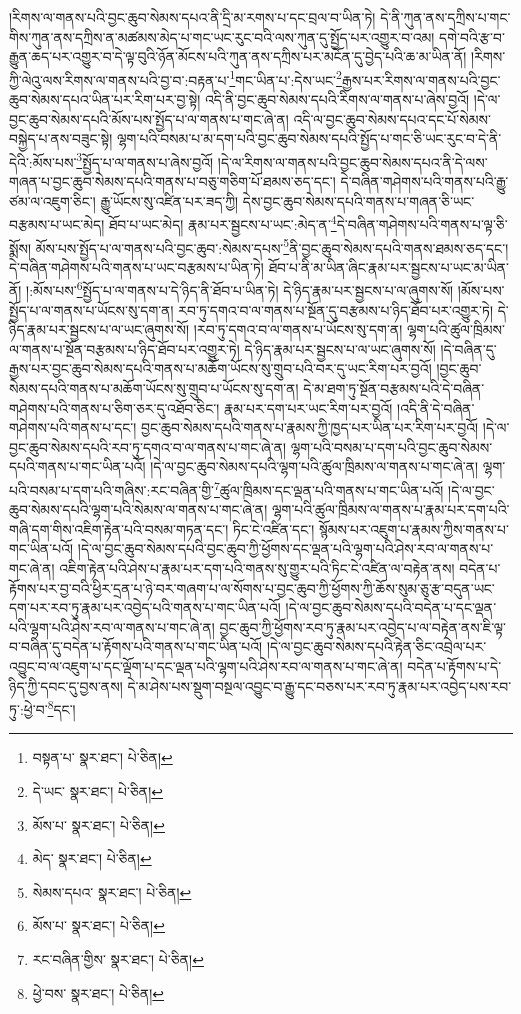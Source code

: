 །རིགས་ལ་གནས་པའི་བྱང་ཆུབ་སེམས་དཔའ་ནི་དྲི་མ་རགས་པ་དང་བྲལ་བ་ཡིན་ཏེ། དེ་ནི་ཀུན་ནས་དཀྲིས་པ་གང་གིས་ཀུན་ནས་དཀྲིས་ན་མཚམས་མེད་པ་གང་ཡང་རུང་བའི་ལས་ཀུན་དུ་སྤྱོད་པར་འགྱུར་བ་འམ། དགེ་བའི་རྩ་བ་རྒྱུན་ཆད་པར་འགྱུར་བ་དེ་ལྟ་བུའི་ཉོན་མོངས་པའི་ཀུན་ནས་དཀྲིས་པར་མངོན་དུ་བྱེད་པའི་ཆ་མ་ཡིན་ནོ། །རིགས་ཀྱི་ལེའུ་ལས་རིགས་ལ་གནས་པའི་བྱ་བ་:བརྟན་པ་\footnote{བསྟན་པ་  སྣར་ཐང་།  པེ་ཅིན། }གང་ཡིན་པ་:དེས་ཡང་\footnote{དེ་ཡང་  སྣར་ཐང་།  པེ་ཅིན། }རྒྱས་པར་རིགས་ལ་གནས་པའི་བྱང་ཆུབ་སེམས་དཔའ་ཡིན་པར་རིག་པར་བྱ་སྟེ། འདི་ནི་བྱང་ཆུབ་སེམས་དཔའི་རིགས་ལ་གནས་པ་ཞེས་བྱའོ། །དེ་ལ་བྱང་ཆུབ་སེམས་དཔའི་མོས་པས་སྤྱོད་པ་ལ་གནས་པ་གང་ཞེ་ན། འདི་ལ་བྱང་ཆུབ་སེམས་དཔའ་དང་པོ་སེམས་བསྐྱེད་པ་ནས་བཟུང་སྟེ། ལྷག་པའི་བསམ་པ་མ་དག་པའི་བྱང་ཆུབ་སེམས་དཔའི་སྤྱོད་པ་གང་ཅི་ཡང་རུང་བ་དེ་ནི་དེའི་:མོས་པས་\footnote{མོས་པ་  སྣར་ཐང་།  པེ་ཅིན། }སྤྱོད་པ་ལ་གནས་པ་ཞེས་བྱའོ། །དེ་ལ་རིགས་ལ་གནས་པའི་བྱང་ཆུབ་སེམས་དཔའ་ནི་དེ་ལས་གཞན་པ་བྱང་ཆུབ་སེམས་དཔའི་གནས་པ་བཅུ་གཅིག་པོ་ཐམས་ཅད་དང་། དེ་བཞིན་གཤེགས་པའི་གནས་པའི་རྒྱུ་ཙམ་ལ་འཇུག་ཅིང་། རྒྱུ་ཡོངས་སུ་འཛིན་པར་ཟད་ཀྱི། དེས་བྱང་ཆུབ་སེམས་དཔའི་གནས་པ་གཞན་ཅི་ཡང་བརྩམས་པ་ཡང་མེད། ཐོབ་པ་ཡང་མེད། རྣམ་པར་སྦྱངས་པ་ཡང་:མེད་ན་\footnote{མེད་  སྣར་ཐང་།  པེ་ཅིན། }དེ་བཞིན་གཤེགས་པའི་གནས་པ་ལྟ་ཅི་སྨོས། མོས་པས་སྤྱོད་པ་ལ་གནས་པའི་བྱང་ཆུབ་:སེམས་དཔས་\footnote{སེམས་དཔའ་  སྣར་ཐང་།  པེ་ཅིན། }ནི་བྱང་ཆུབ་སེམས་དཔའི་གནས་ཐམས་ཅད་དང་། དེ་བཞིན་གཤེགས་པའི་གནས་པ་ཡང་བརྩམས་པ་ཡིན་ཏེ། ཐོབ་པ་ནི་མ་ཡིན་ཞིང་རྣམ་པར་སྦྱངས་པ་ཡང་མ་ཡིན་ནོ། །:མོས་པས་\footnote{མོས་པ་  སྣར་ཐང་།  པེ་ཅིན། }སྤྱོད་པ་ལ་གནས་པ་དེ་ཉིད་ནི་ཐོབ་པ་ཡིན་ཏེ། དེ་ཉིད་རྣམ་པར་སྦྱངས་པ་ལ་ཞུགས་སོ། །མོས་པས་སྤྱོད་པ་ལ་གནས་པ་ཡོངས་སུ་དག་ན། རབ་ཏུ་དགའ་བ་ལ་གནས་པ་སྔོན་དུ་བརྩམས་པ་ཉིད་ཐོབ་པར་འགྱུར་ཏེ། དེ་ཉིད་རྣམ་པར་སྦྱངས་པ་ལ་ཡང་ཞུགས་སོ། །རབ་ཏུ་དགའ་བ་ལ་གནས་པ་ཡོངས་སུ་དག་ན། ལྷག་པའི་ཚུལ་ཁྲིམས་ལ་གནས་པ་སྔོན་བརྩམས་པ་ཉིད་ཐོབ་པར་འགྱུར་ཏེ། དེ་ཉིད་རྣམ་པར་སྦྱངས་པ་ལ་ཡང་ཞུགས་སོ། །དེ་བཞིན་དུ་རྒྱས་པར་བྱང་ཆུབ་སེམས་དཔའི་གནས་པ་མཆོག་ཡོངས་སུ་གྲུབ་པའི་བར་དུ་ཡང་རིག་པར་བྱའོ། །བྱང་ཆུབ་སེམས་དཔའི་གནས་པ་མཆོག་ཡོངས་སུ་གྲུབ་པ་ཡོངས་སུ་དག་ན། དེ་མ་ཐག་ཏུ་སྔོན་བརྩམས་པའི་དེ་བཞིན་གཤེགས་པའི་གནས་པ་ཅིག་ཅར་དུ་འཐོབ་ཅིང་། རྣམ་པར་དག་པར་ཡང་རིག་པར་བྱའོ། །འདི་ནི་དེ་བཞིན་གཤེགས་པའི་གནས་པ་དང་། བྱང་ཆུབ་སེམས་དཔའི་གནས་པ་རྣམས་ཀྱི་ཁྱད་པར་ཡིན་པར་རིག་པར་བྱའོ། །དེ་ལ་བྱང་ཆུབ་སེམས་དཔའི་རབ་ཏུ་དགའ་བ་ལ་གནས་པ་གང་ཞེ་ན། ལྷག་པའི་བསམ་པ་དག་པའི་བྱང་ཆུབ་སེམས་དཔའི་གནས་པ་གང་ཡིན་པའོ། །དེ་ལ་བྱང་ཆུབ་སེམས་དཔའི་ལྷག་པའི་ཚུལ་ཁྲིམས་ལ་གནས་པ་གང་ཞེ་ན། ལྷག་པའི་བསམ་པ་དག་པའི་གཞིས་:རང་བཞིན་གྱི་\footnote{རང་བཞིན་གྱིས་  སྣར་ཐང་།  པེ་ཅིན། }ཚུལ་ཁྲིམས་དང་ལྡན་པའི་གནས་པ་གང་ཡིན་པའོ། །དེ་ལ་བྱང་ཆུབ་སེམས་དཔའི་ལྷག་པའི་སེམས་ལ་གནས་པ་གང་ཞེ་ན། ལྷག་པའི་ཚུལ་ཁྲིམས་ལ་གནས་པ་རྣམ་པར་དག་པའི་གཞི་དག་གིས་འཇིག་རྟེན་པའི་བསམ་གཏན་དང་། ཏིང་ངེ་འཛིན་དང་། སྙོམས་པར་འཇུག་པ་རྣམས་ཀྱིས་གནས་པ་གང་ཡིན་པའོ། །དེ་ལ་བྱང་ཆུབ་སེམས་དཔའི་བྱང་ཆུབ་ཀྱི་ཕྱོགས་དང་ལྡན་པའི་ལྷག་པའི་ཤེས་རབ་ལ་གནས་པ་གང་ཞེ་ན། འཇིག་རྟེན་པའི་ཤེས་པ་རྣམ་པར་དག་པའི་གནས་སུ་གྱུར་པའི་ཏིང་ངེ་འཛིན་ལ་བརྟེན་ནས། བདེན་པ་རྟོགས་པར་བྱ་བའི་ཕྱིར་དྲན་པ་ཉེ་བར་གཞག་པ་ལ་སོགས་པ་བྱང་ཆུབ་ཀྱི་ཕྱོགས་ཀྱི་ཆོས་སུམ་ཅུ་རྩ་བདུན་ཡང་དག་པར་རབ་ཏུ་རྣམ་པར་འབྱེད་པའི་གནས་པ་གང་ཡིན་པའོ། །དེ་ལ་བྱང་ཆུབ་སེམས་དཔའི་བདེན་པ་དང་ལྡན་པའི་ལྷག་པའི་ཤེས་རབ་ལ་གནས་པ་གང་ཞེ་ན། བྱང་ཆུབ་ཀྱི་ཕྱོགས་རབ་ཏུ་རྣམ་པར་འབྱེད་པ་ལ་བརྟེན་ནས་ཇི་ལྟ་བ་བཞིན་དུ་བདེན་པ་རྟོགས་པའི་གནས་པ་གང་ཡིན་པའོ། །དེ་ལ་བྱང་ཆུབ་སེམས་དཔའི་རྟེན་ཅིང་འབྲེལ་པར་འབྱུང་བ་ལ་འཇུག་པ་དང་ལྡོག་པ་དང་ལྡན་པའི་ལྷག་པའི་ཤེས་རབ་ལ་གནས་པ་གང་ཞེ་ན། བདེན་པ་རྟོགས་པ་དེ་ཉིད་ཀྱི་དབང་དུ་བྱས་ནས། དེ་མ་ཤེས་པས་སྡུག་བསྔལ་འབྱུང་བ་རྒྱུ་དང་བཅས་པར་རབ་ཏུ་རྣམ་པར་འབྱེད་པས་རབ་ཏུ་:ཕྱེ་བ་\footnote{ཕྱེ་བས་  སྣར་ཐང་།  པེ་ཅིན། }དང་། 